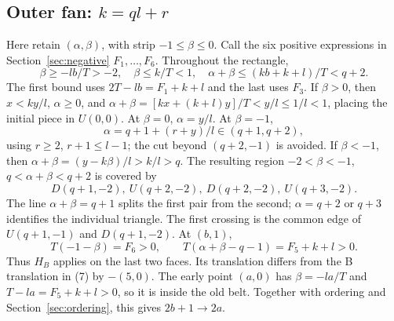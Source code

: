 \documentclass[11pt]{amsart}
\begin{document}
\subsection{Outer fan: \texorpdfstring{$k=ql+r$}{k=ql+r}}
Here retain $(\alpha,\beta)$, with strip $-1\le\beta\le0$.
Call the six positive expressions in Section~\ref{sec:negative} $F_1,\ldots,F_6$.
Throughout the rectangle,
\[
\beta\ge-lb/T>-2,\quad \beta\le k/T<1,\quad
\alpha+\beta\le(kb+k+l)/T<q+2.
\]
The first bound uses $2T-lb=F_1+k+l$ and the last uses $F_3$.
If $\beta>0$, then $x<ky/l$, $\alpha\ge0$, and
$\alpha+\beta=[kx+(k+l)y]/T<y/l\le1/l<1$, placing the initial
piece in $U(0,0)$. At $\beta=0$, $\alpha=y/l$. At $\beta=-1$,
\[
 \alpha=q+1+(r+y)/l\in(q+1,q+2),
\]
using $r\ge2$, $r+1\le l-1$; the cut beyond $(q+2,-1)$ is avoided.
If $\beta<-1$, then $\alpha+\beta=(y-k\beta)/l>k/l>q$.
The resulting region $-2<\beta<-1$, $q<\alpha+\beta<q+2$ is
covered by
\[
D(q+1,-2),\ U(q+2,-2),\ D(q+2,-2),\ U(q+3,-2).
\]
The line $\alpha+\beta=q+1$ splits the first pair from the second;
$\alpha=q+2$ or $q+3$ identifies the individual triangle. The first
crossing is the common edge of $U(q+1,-1)$ and $D(q+1,-2)$.
At $(b,1)$,
\[
T(-1-\beta)=F_6>0,\qquad
T(\alpha+\beta-q-1)=F_5+k+l>0.
\]
Thus $H_B$ applies on the last two faces. Its translation differs from
the B translation in (7) by $-(5,0)$. The early point $(a,0)$ has
$\beta=-la/T$ and $T-la=F_5+k+l>0$, so it is inside the old belt.
Together with ordering and Section~\ref{sec:ordering}, this gives $2b+1\to2a$.
\end{document}
